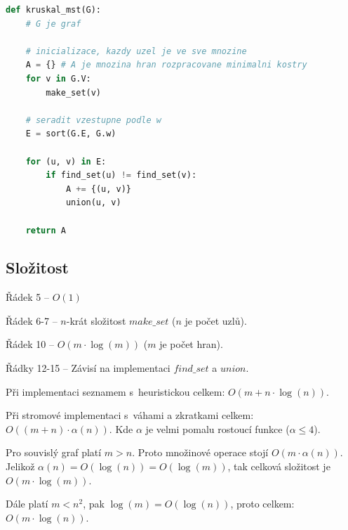 \bigskip\noindent\begin{minipage}{\linewidth}
    \begin{lstlisting}[language=Python, caption={Kruskalův algoritmus. Funkce \texttt{make\_set(v)} vytvoří množinu obsahující $v$, \texttt{find\_set(v)} vrátí reprezentanta množiny ve které se nachází $v$, \texttt{union(u, v)} sjednotí dvě množiny obsahující $u$ a $v$.}]
def kruskal_mst(G):
    # G je graf

    # inicializace, kazdy uzel je ve sve mnozine
    A = {} # A je mnozina hran rozpracovane minimalni kostry
    for v in G.V:
        make_set(v)

    # seradit vzestupne podle w
    E = sort(G.E, G.w)

    for (u, v) in E:
        if find_set(u) != find_set(v):
            A += {(u, v)}
            union(u, v)

    return A
\end{lstlisting}
\end{minipage}

\subsection{Složitost}

\begin{compactitem}
    \item Řádek 5 -- $O(1)$
    \item Řádek 6-7 -- $n$-krát složitost $make\_set$ ($n$ je počet uzlů).
    \item Řádek 10 -- $O(m \cdot \log(m))$ ($m$ je počet hran).
    \item Řádky 12-15 -- Závisí na implementaci $find\_set$ a $union$.
    \begin{compactitem}
        \item Při implementaci seznamem s~heuristickou celkem: $O(m + n \cdot \log(n))$.
        \item Při stromové implementaci s~váhami a zkratkami celkem: $O((m+n) \cdot \alpha(n))$. Kde $\alpha$ je velmi pomalu rostoucí funkce ($\alpha \leq 4$).
    \end{compactitem}
    \item Pro souvislý graf platí $m > n$. Proto množinové operace stojí $O(m \cdot \alpha(n))$. Jelikož $\alpha(n) = O(\log(n)) = O(\log(m))$, tak celková složitost je $O(m \cdot \log(m))$.
    \item Dále platí $m < n^2$, pak $\log(m) = O(\log(n))$, proto celkem: $O(m \cdot \log(n))$.
\end{compactitem}

